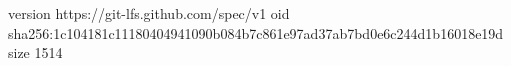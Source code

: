 version https://git-lfs.github.com/spec/v1
oid sha256:1c104181c11180404941090b084b7c861e97ad37ab7bd0e6c244d1b16018e19d
size 1514
